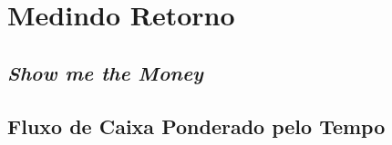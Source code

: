 \chapter{Medindo Retorno}
\section{\textit{Show me the Money}}

\section{Fluxo de Caixa Ponderado pelo Tempo}

